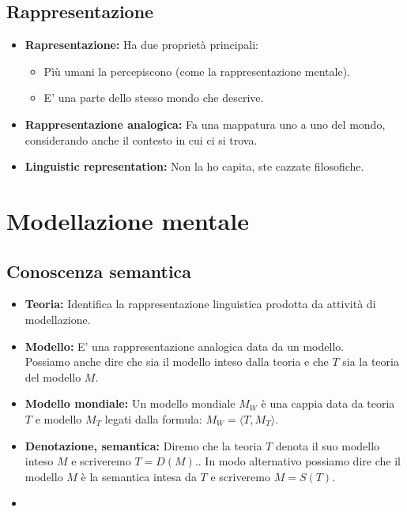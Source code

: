 \documentclass{book}
\begin{document}
    \section{Rappresentazione}
    \begin{itemize}
        \item \textbf{Rapresentazione:} Ha due proprietà principali:
            \begin{itemize}
                \item Pìù umani la percepiscono (come la rappresentazione mentale).
                \item E' una parte dello stesso mondo che descrive.
            \end{itemize}
        \item \textbf{Rappresentazione analogica:} Fa una mappatura uno a uno del mondo, considerando anche il contesto in cui ci si trova.
        \item \textbf{Linguistic representation:} Non la ho capita, ste cazzate filosofiche.
    \end{itemize}

    \chapter{Modellazione mentale}
    \section{Conoscenza semantica}
    \begin{itemize}
        \item \textbf{Teoria:} Identifica la rappresentazione linguistica prodotta da attività di modellazione.
        \item \textbf{Modello:} E' una rappresentazione analogica data da un modello.\\
            Possiamo anche dire che sia il modello inteso dalla teoria e che $T$ sia la teoria del modello $M$.
        \item \textbf{Modello mondiale:} Un modello mondiale $M_W$ è una cappia data da teoria $T$ e modello $M_T$ legati dalla formula: $M_W=\langle T, M_T \rangle$.
        \item \textbf{Denotazione, semantica:} Diremo che la teoria $T$ denota il suo modello inteso $M$ e scriveremo $T=D(M)$..
            In modo alternativo possiamo dire che il modello $M$ è la semantica intesa da $T$ e scriveremo $M=S(T)$.
        \item \textbf{}
    \end{itemize}
\end{document}
